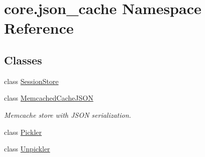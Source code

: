 \hypertarget{namespacecore_1_1json__cache}{\section{core.\-json\-\_\-cache Namespace Reference}
\label{namespacecore_1_1json__cache}
}
\subsection*{Classes}
\begin{DoxyCompactItemize}
\item 
class \hyperlink{classcore_1_1json__cache_1_1SessionStore}{Session\-Store}
\item 
class \hyperlink{classcore_1_1json__cache_1_1MemcachedCacheJSON}{Memcached\-Cache\-J\-S\-O\-N}
\begin{DoxyCompactList}\small\item\em Memcache store with J\-S\-O\-N serialization. \end{DoxyCompactList}\item 
class \hyperlink{classcore_1_1json__cache_1_1Pickler}{Pickler}
\item 
class \hyperlink{classcore_1_1json__cache_1_1Unpickler}{Unpickler}
\end{DoxyCompactItemize}
